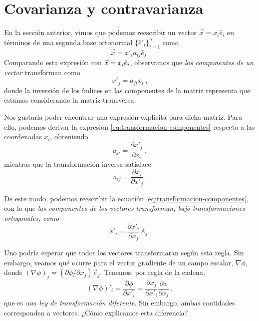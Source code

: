 \section{Covarianza y contravarianza}

En la sección anterior, vimos que podemos reescribir un vector $\vec{x} = x_i \hat{e}_i$ en términos de una segunda base ortonormal $\{\hat{e}'_i\}_{i=1}^n$ como
\begin{equation} \label{eq:transformacion-vector-einstein}
    \vec{x} = x'_i a_{ij} \hat{e}_j \ .
\end{equation}
Comparando esta expresión con $\vec{x} = x_i \hat{e}_i$, observamos que \emph{las componentes de un vector} transforman como
\begin{equation} \label{eq:transformacion-componentes}
    x'_j = a_{ji} x_i \ , 
\end{equation}
donde la inversión de los índices en las componentes de la matriz representa que estamos considerando la matriz transversa.

Nos gustaría poder encontrar una expresión explícita para dicha matriz. Para ello, podemos derivar la expresión \eqref{eq:transformacion-componentes} respecto a las coordenadas $x_i$, obteniendo
\begin{equation}
    a_{ji} = \frac{\partial x'_j}{\partial x_i} \ ,
\end{equation}
mientras que la transformación inversa satisface
\begin{equation}
    a_{ij} = \frac{\partial x_i}{\partial x'_j} \ .
\end{equation}

De este modo, podemos reescribir la ecuación \eqref{eq:transformacion-componentes}, con lo que \emph{las componentes de los vectores transforman, bajo transformaciones ortogonales, como}
\begin{equation}
    x'_i = \frac{\partial x'_i}{\partial x_j} A_j \ .
\end{equation}

Uno podría esperar que todos los vectores transformaran según esta regla. Sin embargo, veamos qué ocurre para el vector gradiente de un campo escalar, $\nabla\phi$, donde $(\nabla \phi)_j = (\partial \phi/\partial x_j )\vec{e}_j$. Tenemos, por regla de la cadena,
\begin{equation}
    (\nabla \phi)'_i = \frac{\partial \phi}{\partial x'_i} = \frac{\partial x_j}{\partial x'_i} \frac{\partial \phi}{\partial x_j} \ ,
\end{equation}
que es \emph{una ley de transformación diferente}. Sin embargo, ambas cantidades corresponden a vectores. ¿Cómo explicamos esta diferencia?

